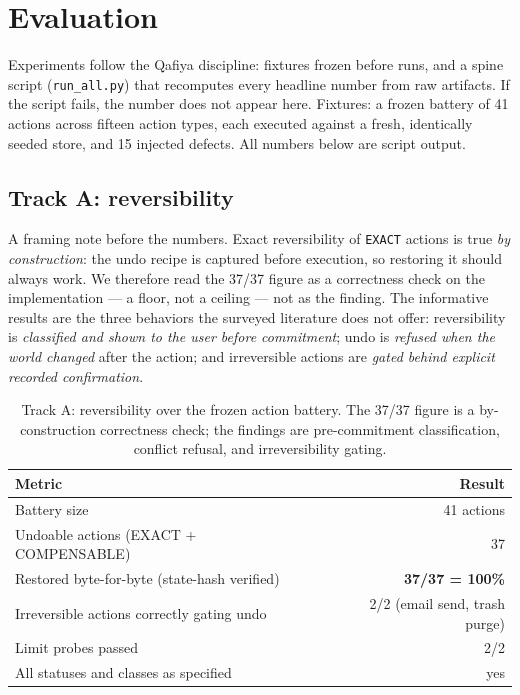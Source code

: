 \documentclass[11pt]{article}
\begin{document}
\section{Evaluation}

Experiments follow the Qafiya discipline: fixtures frozen before runs, and a
spine script (\texttt{run\_all.py}) that recomputes every headline number from
raw artifacts. If the script fails, the number does not appear here. Fixtures: a
frozen battery of 41 actions across fifteen action types, each executed against a
fresh, identically seeded store, and 15 injected defects. All numbers below are
script output.

\subsection{Track A: reversibility}

A framing note before the numbers. Exact reversibility of \texttt{EXACT} actions
is true \emph{by construction}: the undo recipe is captured before execution, so
restoring it should always work. We therefore read the 37/37 figure as a
correctness check on the implementation --- a floor, not a ceiling --- not as the
finding. The informative results are the three behaviors the surveyed literature
does not offer: reversibility is \emph{classified and shown to the user before
commitment}; undo is \emph{refused when the world changed} after the action; and
irreversible actions are \emph{gated behind explicit recorded confirmation}.

\begin{table}[h]
\centering
\begin{tabular}{@{}lr@{}}
\toprule
Metric & Result \\
\midrule
Battery size & 41 actions \\
Undoable actions (EXACT + COMPENSABLE) & 37 \\
Restored byte-for-byte (state-hash verified) & \textbf{37/37 = 100\%} \\
Irreversible actions correctly gating undo & 2/2 (email send, trash purge) \\
Limit probes passed & 2/2 \\
All statuses and classes as specified & yes \\
\bottomrule
\end{tabular}
\caption{Track A: reversibility over the frozen action battery. The 37/37 figure
is a by-construction correctness check; the findings are pre-commitment
classification, conflict refusal, and irreversibility gating.}
\end{table}
\end{document}
